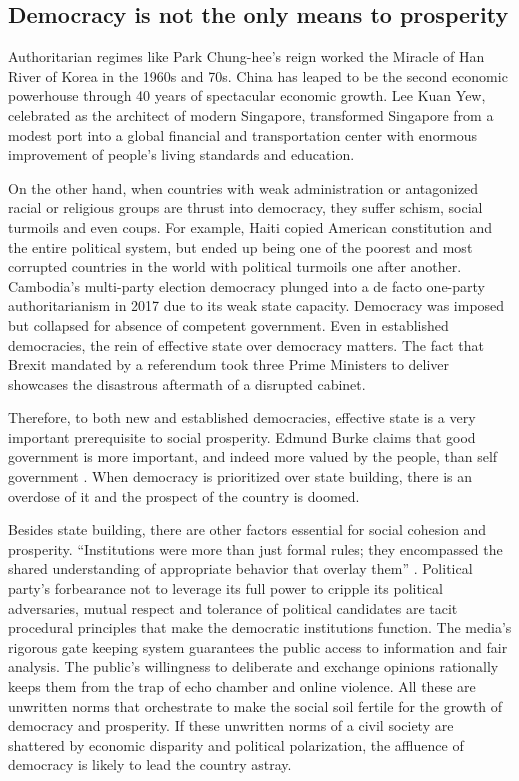 \documentclass{scrartcl}
\theoremstyle{definition}
\begin{document}
\subsection{Democracy is not the only means to prosperity}

Authoritarian regimes like Park Chung-hee's reign worked the Miracle of Han River of Korea in the 1960s and 70s. China has leaped to be the second economic powerhouse through 40 years of spectacular economic growth. Lee Kuan Yew, celebrated as the architect of modern Singapore, transformed Singapore from a modest port into a global financial and transportation center with enormous improvement of people's living standards and education. 

On the other hand, when countries with weak administration or antagonized racial or religious groups are thrust into democracy, they suffer schism, social turmoils and even coups. For example, Haiti copied American constitution and the entire political system, but ended up being one of the poorest and most corrupted countries in the world with political turmoils one after another. Cambodia’s multi-party election democracy plunged into a de facto one-party authoritarianism in 2017 due to its weak state capacity. Democracy was imposed but collapsed for absence of competent government. Even in established democracies, the rein of effective state over democracy matters. The fact that Brexit mandated by a referendum took three Prime Ministers to deliver showcases the disastrous aftermath of a disrupted cabinet. 

Therefore, to both new and established democracies, effective state is a very important prerequisite to social prosperity. Edmund Burke claims that good government is more important, and indeed more valued by the people, than self government \autocite[70]{scand}. When democracy is prioritized over state building, there is an overdose of it and the prospect of the country is doomed. 

Besides state building, there are other factors essential for social cohesion and prosperity. ``Institutions were more than just formal rules; they encompassed the shared understanding of appropriate behavior that overlay them'' \autocite[213]{demdie}. Political party's forbearance not to leverage its full power to cripple its political adversaries, mutual respect and tolerance of political candidates are tacit procedural principles that make the democratic institutions function. The media's rigorous gate keeping system guarantees the public access to information and fair analysis. The public's willingness to deliberate and exchange opinions rationally keeps them from the trap of echo chamber and online violence. All these are unwritten norms that orchestrate to make the social soil fertile for the growth of democracy and prosperity. If these unwritten norms of a civil society are shattered by economic disparity and political polarization, the affluence of democracy is likely to lead the country astray. 
\end{document}
